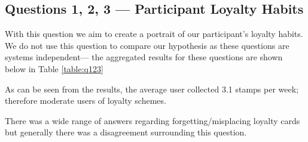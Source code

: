 \subsection{Questions 1, 2, 3 --- Participant Loyalty Habits}
With this question we aim to create a portrait of our participant's loyalty habits. We do not use this question to compare our hypothesis as these questions are systems independent--- the aggregated results for these questions are shown below in Table \ref{table:q123}
    \begin{table}[H]
    \caption{Table showing answers to questions 1,2 and 3 from the study}
    \label{table:q123}
    \end{table}
    
As can be seen from the results, the average user collected 3.1 stamps per week; therefore moderate users of loyalty schemes.

There was a wide range of answers regarding forgetting/misplacing loyalty cards but generally there was a disagreement surrounding this question.
        
